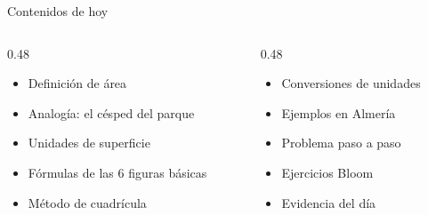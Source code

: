 \documentclass[aspectratio=169, 10pt, spanish]{beamer}
\begin{document}
\begin{frame}[plain]
  \titlepage
\end{frame}

\begin{frame}{Contenidos de hoy}
  \begin{columns}[t]
    \begin{column}{0.48\textwidth}
      \begin{itemize}
        \item Definición de área
        \item Analogía: el césped del parque
        \item Unidades de superficie
        \item Fórmulas de las 6 figuras básicas
        \item Método de cuadrícula
      \end{itemize}
    \end{column}
    \begin{column}{0.48\textwidth}
      \begin{itemize}
        \item Conversiones de unidades
        \item Ejemplos en Almería
        \item Problema paso a paso
        \item Ejercicios Bloom
        \item Evidencia del día
      \end{itemize}
    \end{column}
  \end{columns}
  \vspace{0.4cm}
  \begin{notabox}
    \quad
    \quad
  \end{notabox}
\end{frame}

\end{document}
